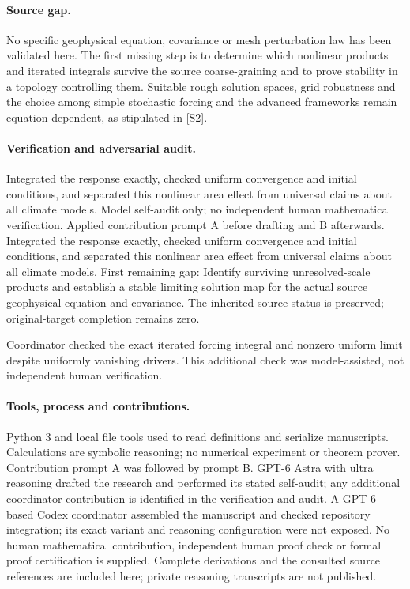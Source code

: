 \documentclass[11pt]{article}
\begin{document}
\paragraph{Source gap.} No specific geophysical equation, covariance or mesh perturbation law has been validated here. The first missing step is to determine which nonlinear products and iterated integrals survive the source coarse-graining and to prove stability in a topology controlling them. Suitable rough solution spaces, grid robustness and the choice among simple stochastic forcing and the advanced frameworks remain equation dependent, as stipulated in [S2].

\paragraph{Verification and adversarial audit.}
Integrated the response exactly, checked uniform convergence and initial conditions, and separated this nonlinear area effect from universal claims about all climate models. Model self-audit only; no independent human mathematical verification. Applied contribution prompt A before drafting and B afterwards. Integrated the response exactly, checked uniform convergence and initial conditions, and separated this nonlinear area effect from universal claims about all climate models. First remaining gap: Identify surviving unresolved-scale products and establish a stable limiting solution map for the actual source geophysical equation and covariance. The inherited source status is preserved; original-target completion remains zero.

Coordinator checked the exact iterated forcing integral and nonzero uniform limit despite uniformly vanishing drivers. This additional check was model-assisted, not independent human verification.

\paragraph{Tools, process and contributions.}
Python 3 and local file tools used to read definitions and serialize manuscripts. Calculations are symbolic reasoning; no numerical experiment or theorem prover. Contribution prompt A was followed by prompt B. GPT-6 Astra with ultra reasoning drafted the research and performed its stated self-audit; any additional coordinator contribution is identified in the verification and audit. A GPT-6-based Codex coordinator assembled the manuscript and checked repository integration; its exact variant and reasoning configuration were not exposed. No human mathematical contribution, independent human proof check or formal proof certification is supplied. Complete derivations and the consulted source references are included here; private reasoning transcripts are not published.
\end{document}
